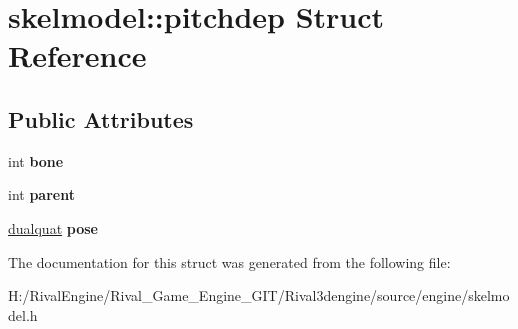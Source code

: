 \hypertarget{structskelmodel_1_1pitchdep}{}\section{skelmodel\+:\+:pitchdep Struct Reference}
\label{structskelmodel_1_1pitchdep}
\subsection*{Public Attributes}
\begin{DoxyCompactItemize}
\item 
\mbox{\label{structskelmodel_1_1pitchdep_afa2b812359b0e231e128b0a5579ab59c}} 
int {\bfseries bone}
\item 
\mbox{\label{structskelmodel_1_1pitchdep_a8befa762fe8b4e0cfeb5dc269c1f99a1}} 
int {\bfseries parent}
\item 
\mbox{\label{structskelmodel_1_1pitchdep_ae9f91b74f953f4c660639b22d5665450}} 
\hyperlink{structdualquat}{dualquat} {\bfseries pose}
\end{DoxyCompactItemize}


The documentation for this struct was generated from the following file\+:\begin{DoxyCompactItemize}
\item 
H\+:/\+Rival\+Engine/\+Rival\+\_\+\+Game\+\_\+\+Engine\+\_\+\+G\+I\+T/\+Rival3dengine/source/engine/skelmodel.\+h\end{DoxyCompactItemize}
